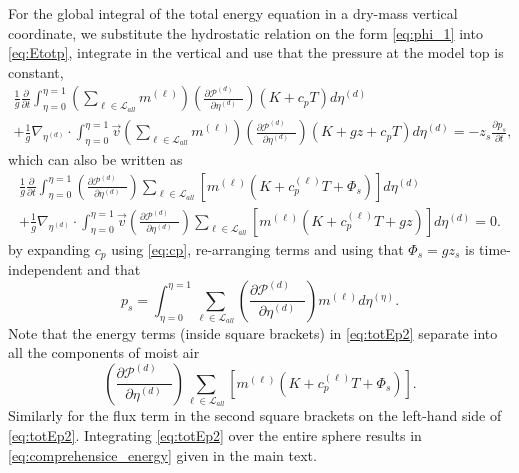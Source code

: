 \documentclass{agujournal}
\begin{document}
{For the global integral of the total energy equation in a dry-mass vertical coordinate, we substitute the hydrostatic relation on the form \eqref{eq:phi_1} into \eqref{eq:Etotp}, integrate in the vertical and use that the pressure at the model top is constant,
\begin{multline}
\frac{1}{g}\frac{\partial }{\partial t}\int_{\eta=0}^{\eta=1} \left( \sum_{\ell \in \mathcal{L}_{all}} m^{(\ell)}\right) \left( \frac{\partial \mathcal{P}^{(d)}\quad }{\partial \eta^{(d)}} \right)\left(K+c_pT\right)d \eta^{(d)}\\ +\frac{1}{g}\nabla_{\eta^{(d)}} \cdot \int_{\eta=0}^{\eta=1} \vec{v} \left( \sum_{\ell \in \mathcal{L}_{all}} m^{(\ell)}\right) \left( \frac{\partial \mathcal{P}^{(d)}\quad }{\partial \eta^{(d)}} \right)\left( K+gz+c_pT \right) d \eta^{(d)} =-z_s\frac{\partial p_s}{\partial t},\label{eq:tmp99}
\end{multline}
which can also be written as
\begin{multline}
\frac{1}{g}\frac{\partial }{\partial t}\int_{\eta=0}^{\eta=1} \left( \frac{\partial \mathcal{P}^{(d)}\quad }{\partial \eta^{(d)}} \right)\sum_{\ell \in \mathcal{L}_{all}} \left[m^{(\ell)} \left(K+c_p^{(\ell)}T+\Phi_s  \right)\right]d \eta^{(d)}\\ +\frac{1}{g}\nabla_{\eta^{(d)}} \cdot \int_{\eta=0}^{\eta=1} \vec{v} \left( \frac{\partial \mathcal{P}^{(d)}\quad }{\partial \eta^{(d)}} \right)\sum_{\ell \in \mathcal{L}_{all}} \left[ m^{(\ell)}\left(K+c_p^{(\ell)}T+gz\right) \right]d \eta^{(d)} =0.\label{eq:totEp2}
\end{multline}
by expanding $c_p$ using \eqref{eq:cp}, re-arranging terms and using that $\Phi_s=gz_s$ is time-independent and that 
\begin{equation}
p_s=\int_{\eta=0}^{\eta=1}\sum_{\ell \in \mathcal{L}_{all}}  \left( \frac{\partial \mathcal{P}^{(d)}\quad }{\partial \eta^{(d)}}\right) m^{(\ell)}d\eta^{(\eta)}.
\end{equation}
Note that the energy terms (inside square brackets) in \eqref{eq:totEp2} separate into all the components of moist air
\begin{equation}
\left( \frac{\partial \mathcal{P}^{(d)}\quad }{\partial \eta^{(d)}} \right)\sum_{\ell \in \mathcal{L}_{all}} \left[ m^{(\ell)}\left(K+c_p^{(\ell)}T+\Phi_s\right)\right].
\end{equation}
Similarly for the flux term in the second square brackets on the left-hand side of \eqref{eq:totEp2}. Integrating \eqref{eq:totEp2} over the entire sphere results in \eqref{eq:comprehensice_energy} given in the main text.


}
\end{document}
